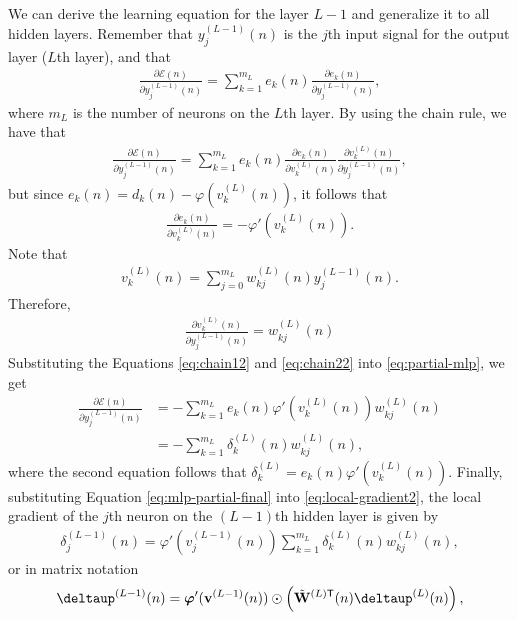 \documentclass[12pt,a4paper]{article}
\newcommand{\trans}{\mathsf{T}}
\begin{document}
We can derive the learning equation for the layer \(L-1\) and generalize it to all hidden layers. Remember that \(y_{j}^{(L-1)}(n)\) is the \(j\)th input signal for the output layer (\(L\)th layer), and that
\begin{align}
    \frac{\partial \mathscr{E}(n)}{\partial y_{j}^{(L-1)}(n)} = \sum_{k=1}^{m_L} e_k(n) \frac{\partial e_k(n)}{\partial y_{j}^{(L-1)}(n)},
\end{align}
where \(m_L\) is the number of neurons on the \(L\)th layer. By using the chain rule, we have that
\begin{align}
    \frac{\partial \mathscr{E}(n)}{\partial y_{j}^{(L-1)}(n)} = \sum_{k=1}^{m_L} e_k(n) \frac{\partial e_k(n)}{\partial v_{k}^{(L)}(n)} \frac{\partial v_{k}^{(L)}(n)}{\partial y_{j}^{(L-1)}(n)},
    \label{eq:partial-mlp}
\end{align}
but since \(e_k(n) = d_k(n) - \varphi(v_k^{(L)}(n))\), it follows that
\begin{align}
    \frac{\partial e_k(n)}{\partial v_{k}^{(L)}(n)} = - \varphi'(v_k^{(L)}(n)).
    \label{eq:chain12}
\end{align}
Note that
\begin{align}
    v_{k}^{(L)}(n) = \sum_{j=0}^{m_L} w_{kj}^{(L)}(n) y_{j}^{(L-1)}(n).
\end{align}
Therefore,
\begin{align}
    \frac{\partial v_{k}^{(L)}(n)}{\partial y_{j}^{(L-1)}(n)} = w_{kj}^{(L)}(n)
    \label{eq:chain22}
\end{align}
Substituting the Equations \eqref{eq:chain12} and \eqref{eq:chain22} into \eqref{eq:partial-mlp}, we get
\begin{align}
    \frac{\partial \mathscr{E}(n)}{\partial y_{j}^{(L-1)}(n)}  & = - \sum_{k=1}^{m_L} e_k(n) \varphi'(v_k^{(L)}(n)) w_{kj}^{(L)}(n) \nonumber \\
    & = - \sum_{k=1}^{m_L} \delta_k^{(L)} (n) w_{kj}^{(L)}(n),
    \label{eq:mlp-partial-final}
\end{align}
where the second equation follows that \(\delta_k^{(L)} = e_k(n) \varphi'(v_k^{(L)}(n))\). Finally, substituting Equation \eqref{eq:mlp-partial-final} into \eqref{eq:local-gradient2}, the local gradient of the \(j\)th neuron on the \((L-1)\)th hidden layer is given by
\begin{align}
    \delta_j^{(L-1)} (n) = \varphi'(v_j^{(L-1)}(n)) \sum_{k=1}^{m_L} \delta_k^{(L)} (n) w_{kj}^{(L)}(n),
\end{align}
or in matrix notation
\begin{align}
    \boldsymbol{\deltaup}^{(L-1)} (n) = \boldsymbol{\varphi}'(\mathbf{v}^{(L-1)}(n)) \odot \left( \tilde{\mathbf{W}}^{(L)\trans}(n) \boldsymbol{\deltaup}^{(L)} (n) \right),
    \label{eq:uptade-layer-L-1}
\end{align}
\end{document}
